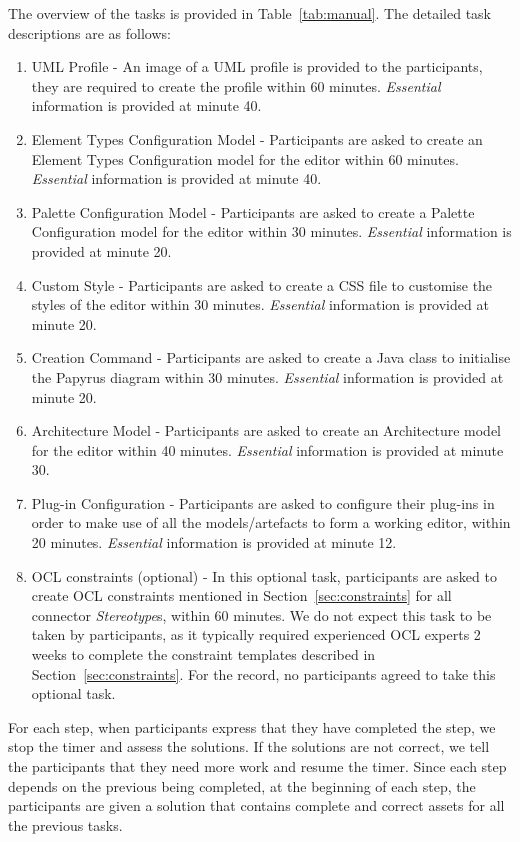 The overview of the tasks is provided in Table~\ref{tab:manual}. The detailed task descriptions are as follows:
\begin{enumerate}
	\item UML Profile - An image of a UML profile is provided to the participants, they are required to create the profile within 60 minutes.
	\textit{Essential} information is provided at minute 40.
	\item Element Types Configuration Model - Participants are asked to create an Element Types Configuration model for the editor within 60 minutes. 
	\textit{Essential} information is provided at minute 40.
	\item Palette Configuration Model - Participants are asked to create a Palette Configuration model for the editor within 30 minutes.
	\textit{Essential} information is provided at minute 20.
	\item Custom Style - Participants are asked to create a CSS file to customise the styles of the editor within 30 minutes.
	\textit{Essential} information is provided at minute 20.
	\item Creation Command - Participants are asked to create a Java class to initialise the Papyrus diagram within 30 minutes.
	\textit{Essential} information is provided at minute 20.
	\item Architecture Model - Participants are asked to create an Architecture model for the editor within 40 minutes.
	\textit{Essential} information is provided at minute 30.
	\item Plug-in Configuration - Participants are asked to configure their plug-ins in order to make use of all the models/artefacts to form a working editor, within 20 minutes.
	\textit{Essential} information is provided at minute 12.
	\item OCL constraints (optional) - In this optional task, participants are asked to create OCL constraints mentioned in Section~\ref{sec:constraints} for all connector \textit{Stereotype}s, within 60 minutes. 
	We do not expect this task to be taken by participants, as it typically required experienced OCL experts 2 weeks to complete the constraint templates described in Section~\ref{sec:constraints}.
	For the record, no participants agreed to take this optional task.
\end{enumerate}

For each step, when participants express that they have completed the step, we stop the timer and assess the solutions. 
If the solutions are not correct, we tell the participants that they need more work and resume the timer.
Since each step depends on the previous being completed, at the beginning of each step, the participants are given a solution that contains complete and correct assets for all the previous tasks.

